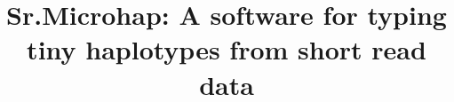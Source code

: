 

\newcommand{\myTitle}{{\sc Sr.Microhap:} A software for typing tiny haplotypes from 
short read data}
\title{\myTitle}

\newcommand{\myAuthors}{ Eric C. Anderson$^{*,\S}$ and AUTHOR TWO$^\dagger$, ETC\ldots}


\newcommand{\myAffiliations}{$^*$Fisheries Ecology Division, 
    Southwest Fisheries Science Center, National Marine Fisheries Service, NOAA,
    110 Shaffer Road,
    Santa Cruz, CA 95060, USA, $^\dagger$Blah Blah}
\renewcommand{\AuthorAddresses}{\myAffiliations}

\renewcommand{\KeyWords}{Blah blah.}

\renewcommand{\CorrespondingAuthor}{Eric C. Anderson, Fisheries Ecology Division, Southwest Fisheries Science
Center, 110 Shaffer Road, Santa Cruz, CA 95060. eric.anderson@noaa.gov}


\newcommand{\myEmailAddress}{eric.anderson@noaa.gov}
\newcommand{\myEmailFootnote}{$^\S$}

\newcommand{\myCopyright}{\copyright US Federal Government work in the public domain in the USA}

\newcommand{\myRunningTitle}{Tiny haplotypes from short read data}
\renewcommand{\RunningTitle}{\myRunningTitle}

\newcommand{\myRunningAuthor}{Eric C. Anderson et al.}

